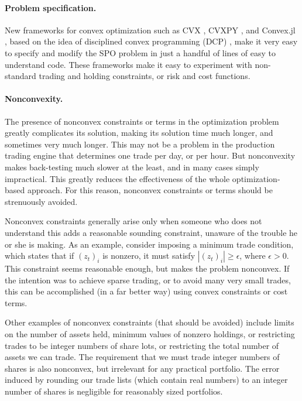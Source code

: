 \documentclass[openany]{now}
\begin{document}
\paragraph{Problem specification.}
New frameworks for convex optimization such as
CVX \cite{fougner2015pogs}, CVXPY \cite{cvxpy}, and Convex.jl \cite{convexjl},
based on the idea of disciplined convex programming (DCP) \cite{grant2006dcp},
make it very easy to specify and modify the SPO problem in just a handful
of lines of easy to understand code.   These frameworks make it
easy to experiment with non-standard trading and holding constraints,
or risk and cost functions.

\paragraph{Nonconvexity.}
The presence of nonconvex constraints or terms in the optimization problem
greatly complicates its solution, making its solution time much longer,
and sometimes very much longer.  This may not be a problem in the production
trading engine that determines one trade per day, or per hour.
But nonconvexity makes back-testing much slower
at the least, and in many cases simply impractical.
This greatly reduces the effectiveness of the whole optimization-based approach.
For this reason, nonconvex constraints or terms should be strenuously avoided.

Nonconvex constraints generally arise only when someone who does not understand
this adds a reasonable sounding constraint, unaware of the trouble he or she is
making.  As an example, consider imposing a minimum trade condition, which states
that if $(z_t)_i$ is nonzero, it must satisfy $|(z_t)_i| \geq \epsilon$, where
$\epsilon >0$.  This constraint seems reasonable enough,
but makes the problem nonconvex.
If the intention was to achieve sparse trading, or to avoid
many very small trades, this can be accomplished
(in a far better way) using convex constraints or cost terms.

Other examples of nonconvex constraints (that should be avoided) include
limits on the number of assets held,
minimum values of nonzero holdings, or restricting trades to be integer
numbers of share lots, or restricting the total number of assets we can trade.
The requirement that we must trade integer numbers of shares is also
nonconvex, but irrelevant for any practical portfolio.
The error induced by rounding our trade lists (which contain real numbers) to
an integer number of shares is negligible for reasonably sized portfolios.
\end{document}
